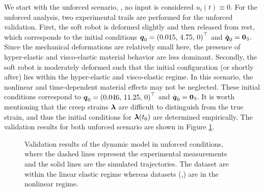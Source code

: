We start with the unforced scenario, \ie, no input is considered $u_i(t) \equiv 0$. For the unforced analysis, two experimental trails are performed for the unforced validation. First, the soft robot is deformed slightly and then released from rest, which corresponds to the initial conditions ${\boldsymbol{q}}_0 = \left(0.015,\,4.75,\,0 \right)^\top$ and ${\dot{\boldsymbol{q}}}_0 = \boldsymbol{0}_3$. Since the mechanical deformations are relatively small here, the presence of hyper-elastic and visco-elastic material behavior are less dominant. Secondly, the soft robot is moderately deformed such that the initial configuration (or shortly after) lies within the hyper-elastic and visco-elastic regime. In this scenario, the nonlinear and time-dependent material effects may not be neglected. These initial conditions correspond to ${\boldsymbol{q}}_0 = \left(0.046,\,11.25,\,0 \right)^\top$ and ${\dot{\boldsymbol{q}}}_0 = \boldsymbol{0}_3$. It is worth mentioning that the creep strains $\boldsymbol{\lambda}$ are difficult to distinguish from the true strain, and thus the initial conditions for $\boldsymbol{\lambda}(t_0)$ are determined empirically. The validation results for both unforced scenario are shown in Figure \ref{fig:C2:compare_states}.


%
\begin{figure}[!t]
  \centering
  \ifx\printFigures\undefined
  \else
  
  \fi
  \vspace{-1mm}
  \caption{Validation results of the
  dynamic model in unforced conditions, where the dashed lines represent the experimental measurements and the solid lines are the simulated trajectories. The dataset  are within the linear elastic regime whereas datasets (,) are in the nonlinear regime. }
  \label{fig:C2:compare_states}
\end{figure}
%

